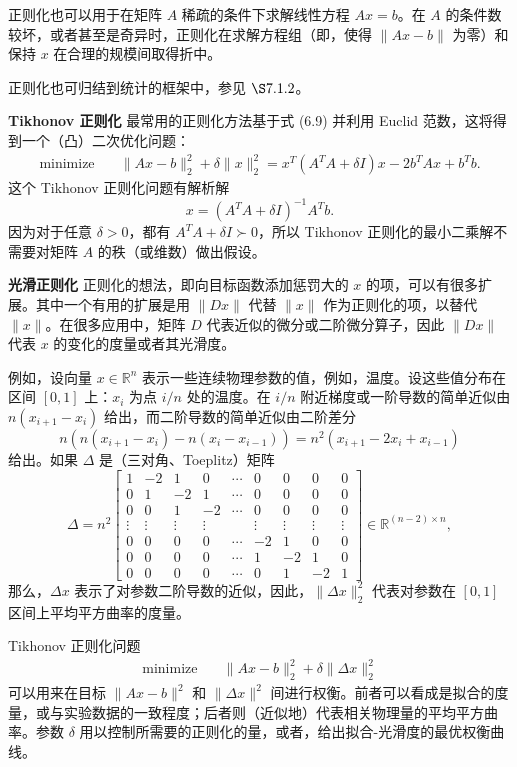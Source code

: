 \documentclass[UTF8, 12pt, fontset=fandol, oneside]{ctexart}
\begin{document}
正则化也可以用于在矩阵 $A$ 稀疏的条件下求解线性方程 $Ax=b$。在 $A$ 的条件数较坏，或者甚至是奇异时，正则化在求解方程组（即，使得 $\|Ax-b\|$ 为零）和保持 $x$ 在合理的规模间取得折中。

正则化也可归结到统计的框架中，参见 $\S 7.1.2$。

\noindent\textbf{Tikhonov 正则化}\quad
最常用的正则化方法基于式 (6.9) 并利用 Euclid 范数，这将得到一个（凸）二次优化问题：
\begin{equation}
\begin{aligned}
\text{minimize}\quad & \|Ax-b\|_2^2+\delta\|x\|_2^2
=x^T(A^TA+\delta I)x-2b^TAx+b^Tb.
\end{aligned}
\tag{6.10}
\end{equation}
这个 Tikhonov 正则化问题有解析解
\[
x=(A^TA+\delta I)^{-1}A^Tb.
\]
因为对于任意 $\delta>0$，都有 $A^TA+\delta I\succ 0$，所以 Tikhonov 正则化的最小二乘解不需要对矩阵 $A$ 的秩（或维数）做出假设。

\noindent\textbf{光滑正则化}\quad
正则化的想法，即向目标函数添加惩罚大的 $x$ 的项，可以有很多扩展。其中一个有用的扩展是用 $\|Dx\|$ 代替 $\|x\|$ 作为正则化的项，以替代 $\|x\|$。在很多应用中，矩阵 $D$ 代表近似的微分或二阶微分算子，因此 $\|Dx\|$ 代表 $x$ 的变化的度量或者其光滑度。

例如，设向量 $x\in\mathbb{R}^n$ 表示一些连续物理参数的值，例如，温度。设这些值分布在区间 $[0,1]$ 上：$x_i$ 为点 $i/n$ 处的温度。在 $i/n$ 附近梯度或一阶导数的简单近似由 $n(x_{i+1}-x_i)$ 给出，而二阶导数的简单近似由二阶差分
\[
n\left(n(x_{i+1}-x_i)-n(x_i-x_{i-1})\right)=n^2(x_{i+1}-2x_i+x_{i-1})
\]
给出。如果 $\Delta$ 是（三对角、Toeplitz）矩阵
\[
\Delta=n^2
\begin{bmatrix}
1 & -2 & 1 & 0 & \cdots & 0 & 0 & 0 & 0\\
0 & 1 & -2 & 1 & \cdots & 0 & 0 & 0 & 0\\
0 & 0 & 1 & -2 & \cdots & 0 & 0 & 0 & 0\\
\vdots & \vdots & \vdots & \vdots & & \vdots & \vdots & \vdots & \vdots\\
0 & 0 & 0 & 0 & \cdots & -2 & 1 & 0 & 0\\
0 & 0 & 0 & 0 & \cdots & 1 & -2 & 1 & 0\\
0 & 0 & 0 & 0 & \cdots & 0 & 1 & -2 & 1
\end{bmatrix}
\in\mathbb{R}^{(n-2)\times n},
\]
那么，$\Delta x$ 表示了对参数二阶导数的近似，因此，$\|\Delta x\|_2^2$ 代表对参数在 $[0,1]$ 区间上平均平方曲率的度量。

Tikhonov 正则化问题
\[
\begin{aligned}
\text{minimize}\quad & \|Ax-b\|_2^2+\delta\|\Delta x\|_2^2
\end{aligned}
\]
可以用来在目标 $\|Ax-b\|^2$ 和 $\|\Delta x\|^2$ 间进行权衡。前者可以看成是拟合的度量，或与实验数据的一致程度；后者则（近似地）代表相关物理量的平均平方曲率。参数 $\delta$ 用以控制所需要的正则化的量，或者，给出拟合-光滑度的最优权衡曲线。
\end{document}
